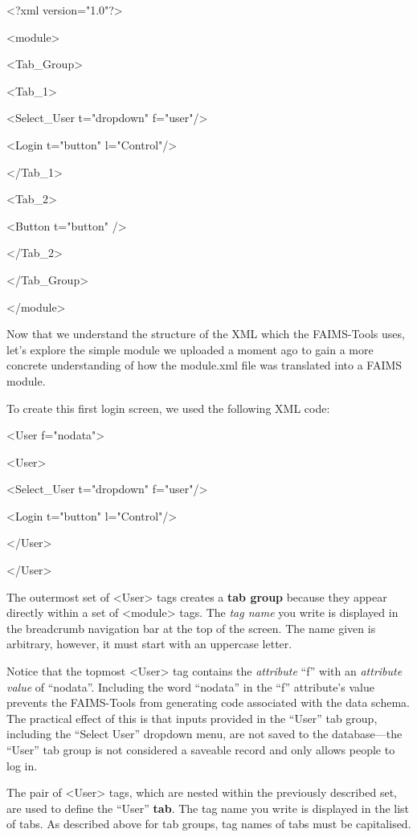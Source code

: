 <?xml version="1.0"?>

<module>

<Tab_Group>

<Tab_1>

<Select_User t="dropdown" f="user"/>

<Login t="button" l="Control"/>

</Tab_1>

<Tab_2>

<Button t="button" />

</Tab_2>

</Tab_Group>

</module>

Now that we understand the structure of the XML which the FAIMS-Tools uses, let's explore the simple module we uploaded a moment ago to gain a more concrete understanding of how the module.xml file was translated into a FAIMS module.

{}

To create this first login screen, we used the following XML code:

<User f="nodata">

<User>

<Select_User t="dropdown" f="user"/>

<Login t="button" l="Control"/>

</User>

</User>

The outermost set of <User> tags creates a {\bf tab group} because they appear directly within a set of <module> tags. The {\em tag name} you write is displayed in the breadcrumb navigation bar at the top of the screen. The name given is arbitrary, however, it must start with an uppercase letter.

Notice that the topmost <User> tag contains the {\em attribute} “f” with an {\em attribute value} of “nodata”. Including the word “nodata” in the “f” attribute's value prevents the FAIMS-Tools from generating code associated with the data schema. The practical effect of this is that inputs provided in the “User” tab group, including the “Select User” dropdown menu, are not saved to the database---the “User” tab group is not considered a saveable record and only allows people to log in.

The pair of <User> tags, which are nested within the previously described set, are used to define the “User” {\bf tab}. The tag name you write is displayed in the list of tabs. As described above for tab groups, tag names of tabs must be capitalised.

